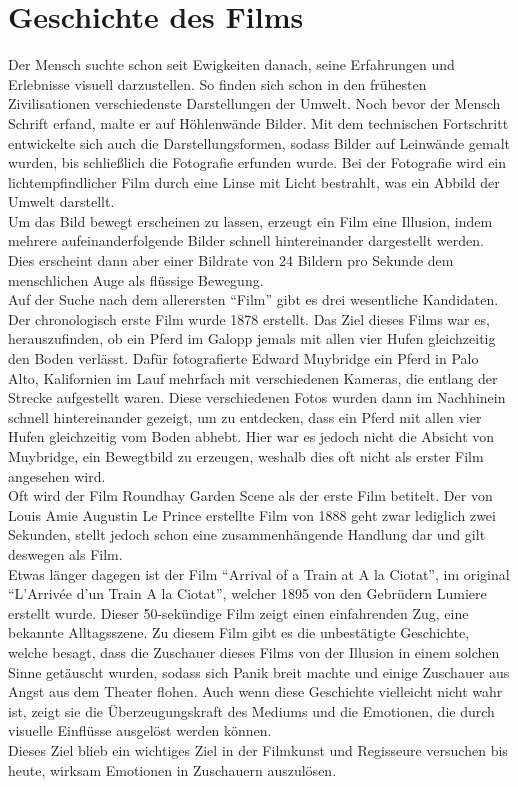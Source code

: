 \section{Geschichte des Films}
Der Mensch suchte schon seit Ewigkeiten danach, seine Erfahrungen und Erlebnisse visuell darzustellen. So finden sich schon in den frühesten Zivilisationen verschiedenste Darstellungen der Umwelt. Noch bevor der Mensch Schrift erfand, malte er auf Höhlenwände Bilder. Mit dem technischen Fortschritt entwickelte sich auch die Darstellungsformen, sodass Bilder auf Leinwände gemalt wurden, bis schließlich die Fotografie erfunden wurde. Bei der Fotografie wird ein lichtempfindlicher Film durch eine Linse mit Licht bestrahlt, was ein Abbild der Umwelt darstellt.\\
Um das Bild bewegt erscheinen zu lassen, erzeugt ein Film eine Illusion, indem mehrere aufeinanderfolgende Bilder schnell hintereinander dargestellt werden. Dies erscheint dann aber einer Bildrate von 24 Bildern pro Sekunde dem menschlichen Auge als flüssige Bewegung.\autocite{Schmidt.2013}\\
Auf der Suche nach dem allerersten \enquote{Film} gibt es drei wesentliche Kandidaten.\autocite{HeadsUp.} Der chronologisch erste Film wurde 1878 erstellt.\autocite{Muybridge.1878} Das Ziel dieses Films war es, herauszufinden, ob ein Pferd im Galopp jemals mit allen vier Hufen gleichzeitig den Boden verlässt. Dafür fotografierte Edward Muybridge ein Pferd in Palo Alto, Kalifornien im Lauf mehrfach mit verschiedenen Kameras, die entlang der Strecke aufgestellt waren. Diese verschiedenen Fotos wurden dann im Nachhinein schnell hintereinander gezeigt, um zu entdecken, dass ein Pferd mit allen vier Hufen gleichzeitig vom Boden abhebt. Hier war es jedoch nicht die Absicht von Muybridge, ein Bewegtbild zu erzeugen, weshalb dies oft nicht als erster Film angesehen wird.\\
Oft wird der Film Roundhay Garden Scene als der erste Film betitelt.\autocite{LePrince.1888} Der von Louis Amie Augustin Le Prince erstellte Film von 1888 geht zwar lediglich zwei Sekunden, stellt jedoch schon eine zusammenhängende Handlung dar und gilt deswegen als Film.\\
Etwas länger dagegen ist der Film \enquote{Arrival of a Train at A la Ciotat}, im original \enquote{L'Arrivée d'un Train A la Ciotat}, welcher 1895 von den Gebrüdern Lumiere erstellt wurde.\autocite{Lumiere.1895} Dieser 50-sekündige Film zeigt einen einfahrenden Zug, eine bekannte Alltagsszene. Zu diesem Film gibt es die unbestätigte Geschichte, welche besagt, dass die Zuschauer dieses Films von der Illusion in einem solchen Sinne getäuscht wurden, sodass sich Panik breit machte und einige Zuschauer aus Angst aus dem Theater flohen. Auch wenn diese Geschichte vielleicht nicht wahr ist, zeigt sie die Überzeugungskraft des Mediums und die Emotionen, die durch visuelle Einflüsse ausgelöst werden können.\\
Dieses Ziel blieb ein wichtiges Ziel in der Filmkunst und Regisseure versuchen bis heute, wirksam Emotionen in Zuschauern auszulösen.\\
